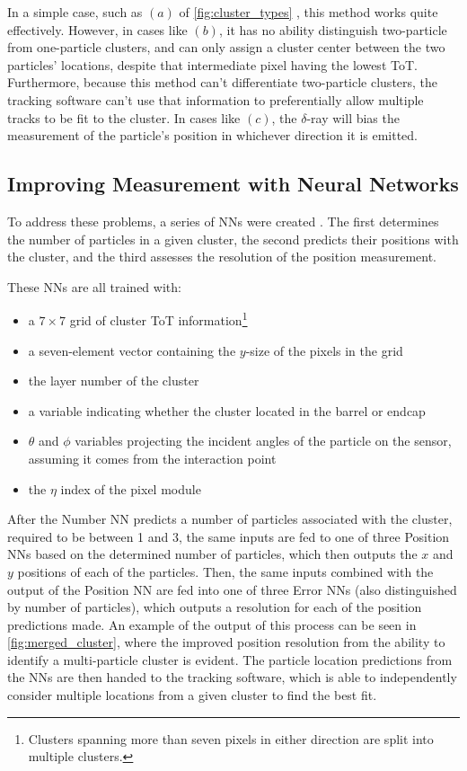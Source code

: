In a simple case, such as $(a)$ of \autoref{fig:cluster_types} , this method works quite effectively. However, in cases like $(b)$, it has no ability distinguish two-particle from one-particle clusters, and can only assign a cluster center between the two particles' locations, despite that intermediate pixel having the lowest \ac{ToT}. Furthermore, because this method can't differentiate two-particle clusters, the tracking software can't use that information to preferentially allow multiple tracks to be fit to the cluster. In cases like $(c)$, the $\delta$-ray will bias the measurement of the particle's position in whichever direction it is emitted. 

\subsection{Improving Measurement with Neural Networks}

To address these problems, a series of \acp{NN} were created \cite{PERF-2012-05}. The first determines the number of particles in a given cluster, the second predicts their positions with the cluster, and the third assesses the resolution of the position measurement. 

These \acp{NN} are all trained with: 
\begin{itemize}
\item a $7\times7$ grid of cluster \ac{ToT} information\footnote{Clusters spanning more than seven pixels in either direction are split into multiple clusters.}
\item a seven-element vector containing the $y$-size of the pixels in the grid
\item the layer number of the cluster
\item a variable indicating whether the cluster located in the barrel or endcap
\item $\theta$ and $\phi$ variables projecting the incident angles of the particle on the sensor, assuming it comes from the interaction point
\item the $\eta$ index of the pixel module
\end{itemize}

After the Number \ac{NN} predicts a number of particles associated with the cluster, required to be between 1 and 3, the same inputs are fed to one of three Position \acp{NN} based on the determined number of particles, which then outputs the $x$ and $y$ positions of each of the particles. Then, the same inputs combined with the output of the Position \ac{NN} are fed into one of three Error \acp{NN} (also distinguished by number of particles), which outputs a resolution for each of the position predictions made. An example of the output of this process can be seen in \autoref{fig:merged_cluster}, where the improved position resolution from the ability to identify a multi-particle cluster is evident. The particle location predictions from the \acp{NN} are then handed to the tracking software, which is able to independently consider multiple locations from a given cluster to find the best fit. 

